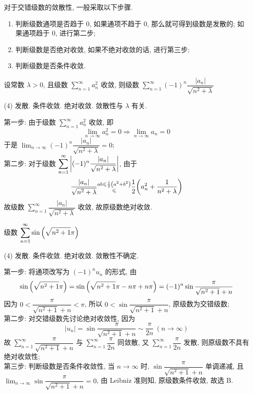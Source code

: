 对于交错级数的敛散性, 一般采取以下步骤.
\begin{enumerate}[label=(\arabic{*})]
    \item 判断级数通项是否趋于 0, 如果通项不趋于 0, 那么就可得到级数是发散的; 如果通项趋于 0, 进行第二步;
    \item 判断级数是否绝对收敛, 如果不绝对收敛的话, 进行第三步;
    \item 判断级数是否条件收敛.
\end{enumerate}

\begin{example}
    设常数 $\lambda>0$, 且级数 $\displaystyle \sum_{n=1}^{\infty} a_n^2$ 收敛, 则级数 $ \displaystyle \sum_{n=1}^{\infty} (-1)^{n}\dfrac{|a_n|}{\sqrt{n^2+\lambda}} $
    \begin{tasks}(4)
        \task 发散.
        \task 条件收敛.
        \task 绝对收敛.
        \task 敛散性与 $\lambda$ 有关.
    \end{tasks}
\end{example}
\begin{solution}
    第一步: 由于级数 $\displaystyle \sum_{n=1}^{\infty} a_n^2$ 收敛, 即
    $$
        \lim_{n \to \infty}a_n^2=0\Rightarrow \lim_{n \to \infty}a_n=0
    $$
    于是 $ \displaystyle \lim_{n \to \infty}(-1)^n\dfrac{|a_n|}{\sqrt{n^2+\lambda}} =0$; \\
    第二步: 对于级数 $ \displaystyle \sum_{n=1}^{\infty} \qty|(-1)^{n}\dfrac{|a_n|}{\sqrt{n^2+\lambda}}| $, 由于
    $$
        \dfrac{|a_n|}{\sqrt{n^2+\lambda}}\substack{ab\leqslant \frac{1}{2}\qty(a^2+b^2)\\ \leqslant }\dfrac{1}{2}\qty(a_n^2+\dfrac{1}{n^2+\lambda})
    $$
    故级数 $\displaystyle \sum_{n=1}^{\infty} \dfrac{|a_n|}{\sqrt{n^2+\lambda}}$ 收敛, 故原级数绝对收敛.
\end{solution}

\begin{example}
    级数 $\displaystyle \sum_{n=1}^{\infty} \sin\qty(\sqrt{n^2+1}\pi)$
    \begin{tasks}
        (4)
        \task 发散.
        \task 条件收敛.
        \task 绝对收敛.
        \task 敛散性不确定.
    \end{tasks}
\end{example}
\begin{solution}
    第一步: 将通项改写为 $(-1)^n u_n$ 的形式, 由 
    $$
    \sin\qty(\sqrt{n^2+1}\pi)=\sin\qty(\sqrt{n^2+1}\pi-n\pi+n\pi)=(-1)^n\sin\dfrac{\pi}{\sqrt{n^2+1}+n}
    $$
    因为 $0<\dfrac{\pi}{\sqrt{n^2+1}+n}<\pi$, 所以 $0<\sin\dfrac{\pi}{\sqrt{n^2+1}+n}$, 原级数为交错级数;\\ 
    第二步: 对交错级数先讨论绝对收敛性, 因为 
    $$
    |u_n|=\sin\dfrac{\pi}{\sqrt{n^2+1}+n}\sim \dfrac{\pi}{2n}~(n\to \infty)
    $$
    故 $ \displaystyle \sum_{n=1}^{\infty} \dfrac{\pi}{\sqrt{n^2+1}+n} $ 与 $ \displaystyle \sum_{n=1}^{\infty} \dfrac{\pi}{2n} $ 同敛散, 又 $ \displaystyle \sum_{n=1}^{\infty} \dfrac{\pi}{2n} $ 发散, 则原级数不具有绝对收敛性; \\ 
    第三步: 判断级数是否条件收敛性, 当 $n\to \infty$ 时, $\sin\dfrac{\pi}{\sqrt{n^2+1}+n}$ 单调递减, 且 $ \displaystyle \lim_{n \to \infty}\sin\dfrac{\pi}{\sqrt{n^2+1}+n} =0$, 由 Leibniz 准则知, 原级数条件收敛, 故选 B.
\end{solution}


